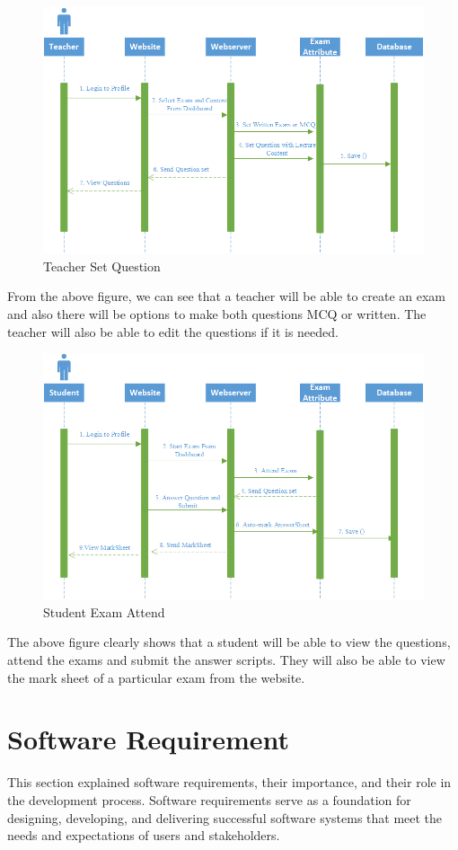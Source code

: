 \begin{figure}[H]
    \centering
    \includegraphics[scale=.7]{img/teacheruml.png}
    \caption{Teacher Set Question}
    \label{fig:uml2}
\end{figure}
From the above figure, we can see that a teacher will be able to create an exam and also there will be options to make both questions MCQ or written. The teacher will also be able to edit the questions if it is needed.
\begin{figure}[H]
    \centering
    \includegraphics[scale=.7]{img/studentuml.png}
    \caption{Student Exam Attend}
    \label{fig:uml3}
\end{figure}
The above figure clearly shows that a student will be able to view the questions, attend the exams and submit the answer scripts. They will also be able to view the mark sheet of a particular exam from the website. 

\section{Software Requirement} 
This section explained software requirements, their importance, and their role in the development process. Software requirements serve as a foundation for designing, developing, and delivering successful software systems that meet the needs and expectations of users and stakeholders.

